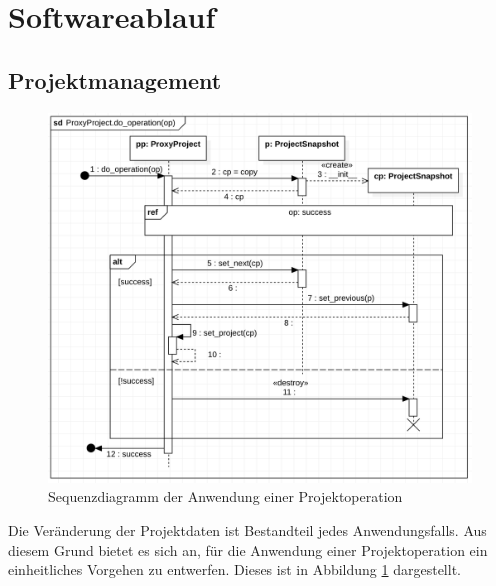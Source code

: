 \documentclass{article}
\begin{document}
\newpage
\section{Softwareablauf}
\subsection{Projektmanagement}
\begin{figure}[H]%
    \centering
    \includegraphics[width=13cm]{entwurf/Entwurf_dokument/img/Michael/sd_ProxyProject.do_operation.png}
    \caption{Sequenzdiagramm der Anwendung einer Projektoperation}
    \label{fig:sq:do_operation}
\end{figure}

Die Veränderung der Projektdaten ist Bestandteil jedes Anwendungsfalls. Aus diesem Grund bietet es sich an, für die Anwendung einer Projektoperation ein einheitliches Vorgehen zu entwerfen. Dieses ist in Abbildung \ref{fig:sq:do_operation} dargestellt.\\
\end{document}
